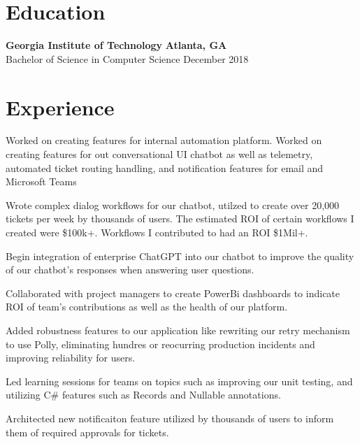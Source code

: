 \documentclass[line]{resume}
\begin{document}
\begin{center}
\end{center}
\vspace{-9px}
\section{Education}
\textbf{Georgia Institute of Technology} \hfill \textbf{Atlanta, GA} \\
Bachelor of Science in Computer Science  \hfill December 2018

\vspace{-3px}
\section{Experience}
\vspace{-1px}

\begin{myitemize}
	\item Worked on creating features for internal automation platform. Worked on creating features for out conversational UI chatbot as well as telemetry, automated ticket routing handling,
	and notification features for email and Microsoft Teams
	\item Wrote complex dialog workflows for our chatbot, utilzed to create over 20,000 tickets per week by thousands of users. The estimated ROI of certain workflows I created were \$100k+. Workflows I contributed to had an ROI \$1Mil+. 
	\item Begin integration of enterprise ChatGPT into our chatbot to improve the quality of our chatbot's responses when answering user questions.
	\item Collaborated with project managers to create PowerBi dashboards to indicate ROI of team's contributions as well as the health of our platform.
	\item Added robustness features to our application like rewriting our retry mechanism to use Polly, eliminating hundres or reocurring production incidents and improving reliability for users.
	\item Led learning sessions for teams on topics such as improving our unit testing, and utilizing C\# features such as Records and Nullable annotations.
	\item Architected new notificaiton feature utilized by thousands of users to inform them of required approvals for tickets.
\end{myitemize}
\end{document}
